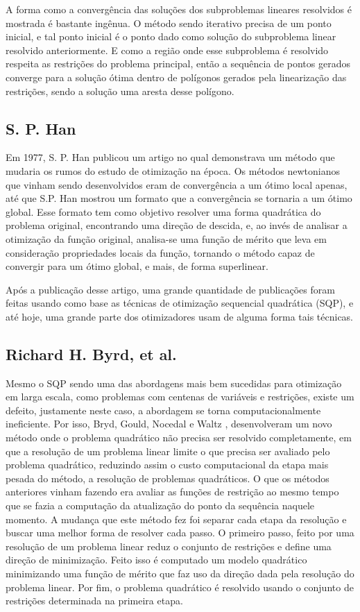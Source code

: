 A forma como a convergência das soluções dos subproblemas lineares resolvidos é mostrada é
bastante ingênua. O método sendo iterativo precisa de um ponto inicial, e tal ponto inicial é o
ponto dado como solução do subproblema linear resolvido anteriormente. E como a região onde esse
subproblema é resolvido respeita as restrições do problema principal, então a sequência de pontos
gerados converge para a solução ótima dentro de polígonos gerados pela linearização das
restrições, sendo a solução uma aresta desse polígono.

\subsection{S. P. Han}

\noindent
Em 1977, S. P. Han \cite{han1977globally} publicou um artigo no qual demonstrava um método que mudaria
os rumos do estudo de otimização na época. Os métodos newtonianos que vinham sendo desenvolvidos
eram de convergência a um ótimo local apenas, até que S.P. Han mostrou um formato que a convergência
se tornaria a um ótimo global. Esse formato tem como objetivo resolver uma forma quadrática do
problema original, encontrando uma direção de descida, e, ao invés de analisar a otimização da
função original, analisa-se uma função de mérito que leva em consideração propriedades locais da
função, tornando o método capaz de convergir para um ótimo global, e mais, de forma superlinear.

Após a publicação desse artigo, uma grande quantidade de publicações foram feitas usando como
base as técnicas de otimização sequencial quadrática (SQP), e até hoje, uma grande parte dos
otimizadores usam de alguma forma tais técnicas.

\subsection{Richard H. Byrd, et al.}

\noindent
Mesmo o SQP sendo uma das abordagens mais bem sucedidas para otimização em larga escala, como
problemas com centenas de variáveis e restrições, existe um defeito, justamente neste caso, a
abordagem se torna computacionalmente ineficiente. Por isso, Bryd, Gould, Nocedal e
Waltz \cite{byrd2003algorithm}, desenvolveram um novo método onde o problema quadrático não precisa
ser resolvido completamente, em que a resolução de um problema linear limite o que precisa ser
avaliado pelo problema quadrático, reduzindo assim o custo computacional da etapa mais pesada do
método, a resolução de problemas quadráticos. O que os métodos anteriores vinham fazendo era avaliar
as funções de restrição ao mesmo tempo que se fazia a computação da atualização do ponto da
sequência naquele momento. A mudança que este método fez foi separar cada etapa da resolução e
buscar uma melhor forma de resolver cada passo. O primeiro passo, feito por uma resolução de um
problema linear reduz o conjunto de restrições e define uma direção de minimização. Feito isso é
computado um modelo quadrático minimizando uma função de mérito que faz uso da direção dada pela
resolução do problema linear. Por fim, o problema quadrático é resolvido usando o conjunto de
restrições determinada na primeira etapa.
